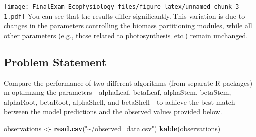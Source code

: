 \documentclass[
]{article}
\newenvironment{Shaded}{\begin{snugshade}}{\end{snugshade}}
\newcommand{\AttributeTok}[1]{\textcolor[rgb]{0.13,0.29,0.53}{#1}}
\newcommand{\ConstantTok}[1]{\textcolor[rgb]{0.56,0.35,0.01}{#1}}
\newcommand{\FunctionTok}[1]{\textcolor[rgb]{0.13,0.29,0.53}{\textbf{#1}}}
\newcommand{\NormalTok}[1]{#1}
\newcommand{\OtherTok}[1]{\textcolor[rgb]{0.56,0.35,0.01}{#1}}
\newcommand{\SpecialCharTok}[1]{\textcolor[rgb]{0.81,0.36,0.00}{\textbf{#1}}}
\newcommand{\StringTok}[1]{\textcolor[rgb]{0.31,0.60,0.02}{#1}}
\begin{document}
\begin{Shaded}
\end{Shaded}

\texttt{[image: FinalExam\_Ecophysiology\_files/figure-latex/unnamed-chunk-3-1.pdf]}
You can see that the results differ significantly. This variation is due
to changes in the parameters controlling the biomass partitioning
modules, while all other parameters (e.g., those related to
photosynthesis, etc.) remain unchanged.

\subsection{Problem Statement}\label{problem-statement}

Compare the performance of two different algorithms (from separate R
packages) in optimizing the parameters---alphaLeaf, betaLeaf, alphaStem,
betaStem, alphaRoot, betaRoot, alphaShell, and betaShell---to achieve
the best match between the model predictions and the observed values
provided below.

\begin{Shaded}
\begin{Highlighting}[]
\NormalTok{observations }\OtherTok{\textless{}{-}} \FunctionTok{read.csv}\NormalTok{(}\StringTok{"\textasciitilde{}/observed\_data.csv"}\NormalTok{)}
\FunctionTok{kable}\NormalTok{(observations)}
\end{Highlighting}
\end{Shaded}
\end{document}
